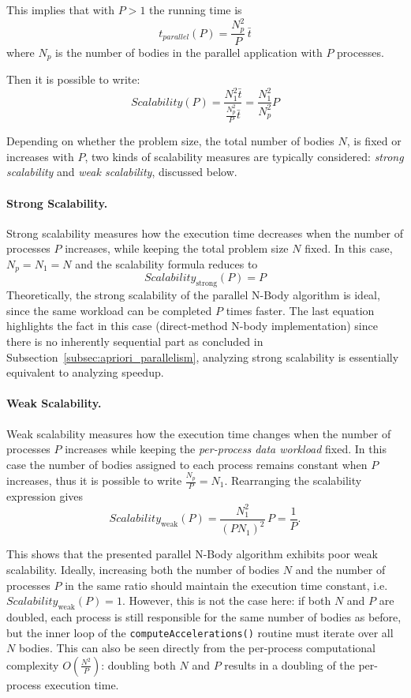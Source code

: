 \documentclass{article}
\begin{document}
This implies that with $P>1$ the running time is
\begin{equation}
t_{{parallel}}(P) = \frac{N_p^2}{P} \, \bar{t}
\end{equation}
where $N_p$ is the number of bodies in the parallel application with $P$ processes.

Then it is possible to write:
\begin{equation}
Scalability(P) = \frac{N^2_1\bar{t}}{\frac{N_p^2}{P}\bar{t}} = \frac{N_1^2}{N_p^2}P
\end{equation}

Depending on whether the problem size, the total number of bodies $N$, is fixed or increases with $P$, two kinds of scalability measures are typically considered: \emph{strong scalability} and \emph{weak scalability}, discussed below.

\paragraph{Strong Scalability.}
Strong scalability measures how the execution time decreases when the number of processes $P$ increases, while keeping the total problem size $N$ fixed.  
In this case, $N_p = N_1 = N$ and the scalability formula reduces to
\[
Scalability_{\text{strong}}(P) = P
\]
Theoretically, the strong scalability of the parallel N-Body algorithm is ideal, since the same workload can be completed $P$ times faster.
The last equation highlights the fact in this case (direct-method N-body implementation) since there is no inherently sequential part as concluded in Subsection~\ref{subsec:apriori_parallelism}, analyzing strong scalability is essentially equivalent to analyzing speedup.

\paragraph{Weak Scalability.}
Weak scalability measures how the execution time changes when the number of processes $P$ increases while keeping the \emph{per-process data workload} fixed.  
In this case the number of bodies assigned to each process remains constant when $P$ increases, thus it is possible to write $\tfrac{N_p}{P} = N_1$.  
Rearranging the scalability expression gives
\[
Scalability_{\text{weak}}(P) = \frac{N_1^2}{(P N_1)^2} \, P = \frac{1}{P}.
\]

This shows that the presented parallel N-Body algorithm exhibits poor weak scalability.  
Ideally, increasing both the number of bodies $N$ and the number of processes $P$ in the same ratio should maintain the execution time constant, i.e.\ $Scalability_{\text{weak}}(P) = 1$.  
However, this is not the case here: if both $N$ and $P$ are doubled, each process is still responsible for the same number of bodies as before, but the inner loop of the \texttt{compute\discretionary{}{}{}Accelerations()} routine must iterate over all $N$ bodies.  
This can also be seen directly from the per-process computational complexity $O\!\left(\tfrac{N^2}{P}\right)$: doubling both $N$ and $P$ results in a doubling of the per-process execution time.
\end{document}
